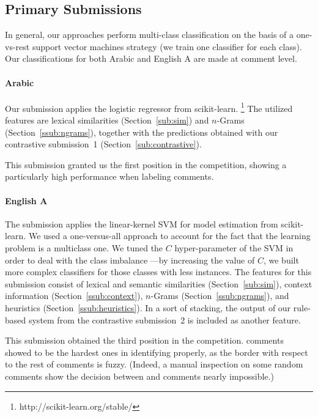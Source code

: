 \subsection{Primary Submissions}

In general, our approaches perform multi-class classification on the basis of a 
one-vs-rest support vector machines strategy (\ie we train one classifier for 
each class). Our classifications for both Arabic and English A are made at 
comment level.


\paragraph{Arabic} Our submission applies the logistic regressor from 
scikit-learn.%
\footnote{http://scikit-learn.org/stable/}
The utilized features are lexical similarities (Section~\ref{sub:sim}) and  
$n$-Grams (Section~\ref{ssub:ngrams}), together with the predictions obtained 
with our contrastive submission~1 (\cf Section~\ref{sub:contrastive}). 

This submission granted us the first position in the competition, showing a 
particularly high performance when labeling \rel comments.

\paragraph{English A}
The submission applies the linear-kernel SVM for model estimation from 
scikit-learn. We used a one-versus-all approach to account for the fact that 
the learning problem is a multiclass one. We tuned the $C$ hyper-parameter of 
the SVM in order to deal with the class imbalance ---by increasing the value of 
$C$, we built more complex classifiers for those classes with less instances. 
% 
The features for this submission consist of lexical and semantic similarities 
(Section~\ref{sub:sim}), context information (Section~\ref{ssub:context}), 
$n$-Grams (Section~\ref{ssub:ngrams}), and heuristics 
(Section~\ref{ssub:heuristics}). In a sort of stacking, the output of our 
rule-based system from the contrastive submission~2 is included as another 
feature. 

This submission obtained the third position in the competition. \pot comments 
showed to be the hardest ones in identifying properly, as the border with 
respect to the rest of comments is fuzzy. (Indeed, a manual inspection on some 
random comments show the decision between \good and \pot comments nearly 
impossible.)

